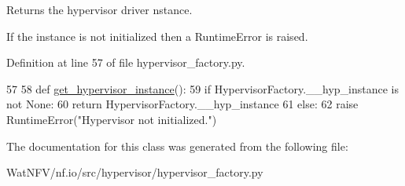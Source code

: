 Returns the hypervisor driver nstance. 

If the instance is not initialized then a Runtime\-Error is raised. 

Definition at line 57 of file hypervisor\-\_\-factory.\-py.


\begin{DoxyCode}
57 
58     \textcolor{keyword}{def }\hyperlink{classhypervisor_1_1hypervisor__factory_1_1HypervisorFactory_ade4356e4251e644d580f8c1c53fc704e}{get\_hypervisor\_instance}():
59         \textcolor{keywordflow}{if} HypervisorFactory.\_\_hyp\_instance \textcolor{keywordflow}{is} \textcolor{keywordflow}{not} \textcolor{keywordtype}{None}:
60             \textcolor{keywordflow}{return} HypervisorFactory.\_\_hyp\_instance
61         \textcolor{keywordflow}{else}:
62             \textcolor{keywordflow}{raise} RuntimeError(\textcolor{stringliteral}{"Hypervisor not initialized."})
\end{DoxyCode}


The documentation for this class was generated from the following file\-:\begin{DoxyCompactItemize}
\item 
Wat\-N\-F\-V/nf.\-io/src/hypervisor/hypervisor\-\_\-factory.\-py\end{DoxyCompactItemize}
